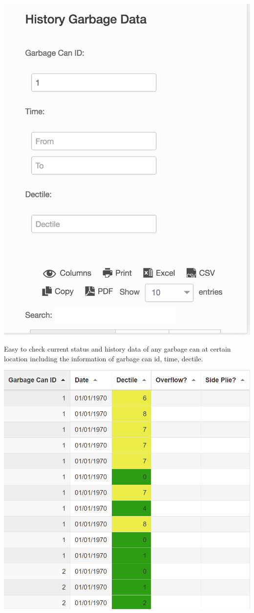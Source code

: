 \documentclass[a0b,portrait]{a0poster}
\begin{document}
\begin{multicols}{3}
\begin{center}
\includegraphics[width=0.85\linewidth]{database01-mobile.png}
\end{center}
Easy to check current status and history data of any garbage can at certain location including the information of garbage can id, time, dectile.
\begin{center}
\includegraphics[width=0.85\linewidth]{database02.PNG}

\end{center}
\end{multicols}
\end{document}
